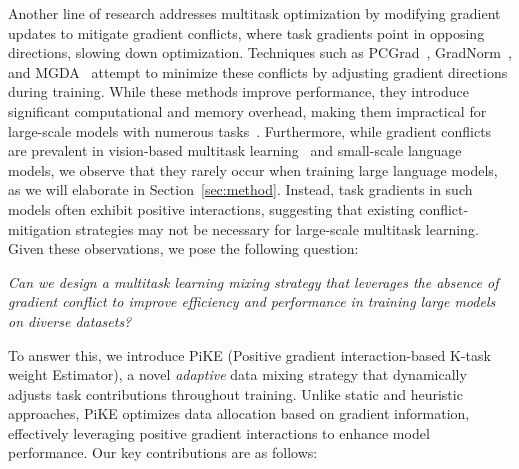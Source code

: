 Another line of research addresses multitask optimization by modifying gradient updates to mitigate gradient conflicts, where task gradients point in opposing directions, slowing down optimization. Techniques such as PCGrad~\citep{yu2020gradient}, GradNorm~\citep{chen2018gradnorm}, and MGDA~\citep{desideri2012multiple} attempt to minimize these conflicts by adjusting gradient directions during training. While these methods improve performance, they introduce significant computational and memory overhead, making them impractical for large-scale models with numerous tasks~\citep{xin2022current}. Furthermore, while gradient conflicts are prevalent in vision-based multitask learning~\citep{wang2020gradient, liu2021conflict} and small-scale language models, we observe that they rarely occur when training large language models, as we will elaborate in Section~\ref{sec:method}. Instead, task gradients in such models often exhibit positive interactions, suggesting that existing conflict-mitigation strategies may not be necessary for large-scale multitask learning. Given these observations, we pose the following question:




%


\begin{center}
%
\emph{Can we design a multitask learning mixing strategy that leverages the absence of gradient conflict to improve efficiency and performance in training large models on diverse datasets?}
\end{center}


To answer this, we introduce PiKE (Positive gradient interaction-based K-task weight Estimator), a novel \textit{adaptive} data mixing strategy that dynamically adjusts task contributions throughout training. Unlike static and heuristic approaches, PiKE optimizes data allocation based on gradient information, effectively leveraging positive gradient interactions to enhance model performance. Our key contributions are as follows:


